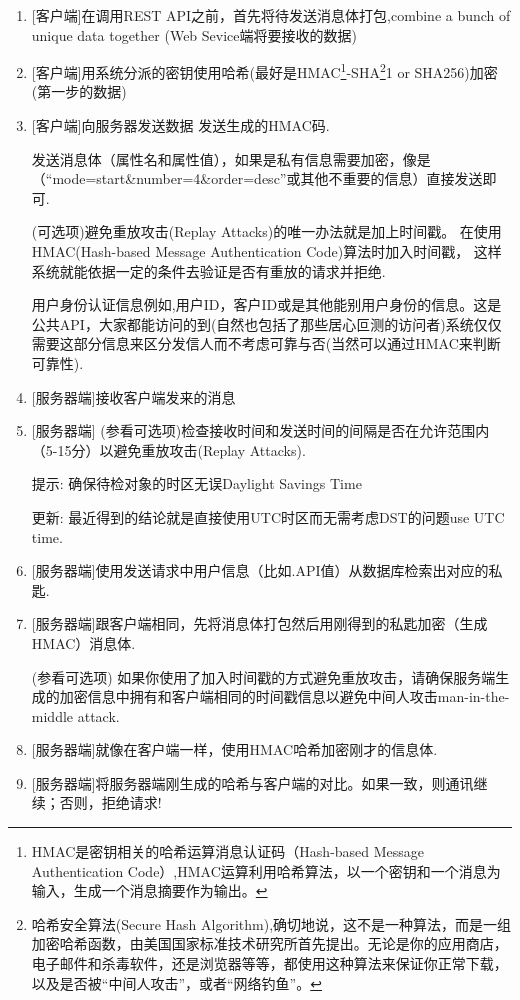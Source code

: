 \documentclass{book}
\begin{document}
\begin{enumerate}
\setcounter{enumi}{0}
\item{[客户端]在调用REST API之前，首先将待发送消息体打包,combine a bunch of unique data together (Web Sevice端将要接收的数据)}
\item{[客户端]用系统分派的密钥使用哈希(最好是HMAC\footnote{HMAC是密钥相关的哈希运算消息认证码（Hash-based Message Authentication Code）,HMAC运算利用哈希算法，以一个密钥和一个消息为输入，生成一个消息摘要作为输出。}-SHA\footnote{哈希安全算法(Secure Hash Algorithm),确切地说，这不是一种算法，而是一组加密哈希函数，由美国国家标准技术研究所首先提出。无论是你的应用商店，电子邮件和杀毒软件，还是浏览器等等，都使用这种算法来保证你正常下载，以及是否被“中间人攻击”，或者“网络钓鱼”。}1 or SHA256)加密(第一步的数据)}
\item{[客户端]向服务器发送数据}
发送生成的HMAC码.

发送消息体（属性名和属性值），如果是私有信息需要加密，像是（“mode=start\&number=4\&order=desc”或其他不重要的信息）直接发送即可.

(可选项)避免重放攻击(Replay Attacks)的唯一办法就是加上时间戳。
在使用HMAC(Hash-based Message Authentication Code)算法时加入时间戳，
这样系统就能依据一定的条件去验证是否有重放的请求并拒绝.

用户身份认证信息例如,用户ID，客户ID或是其他能别用户身份的信息。这是公共API，大家都能访问的到(自然也包括了那些居心叵测的访问者)系统仅仅需要这部分信息来区分发信人而不考虑可靠与否(当然可以通过HMAC来判断可靠性).

\item{[服务器端]接收客户端发来的消息}

\item{[服务器端] (参看可选项)检查接收时间和发送时间的间隔是否在允许范围内（5-15分）以避免重放攻击(Replay Attacks).}

提示: 确保待检对象的时区无误Daylight Savings Time 

更新: 最近得到的结论就是直接使用UTC时区而无需考虑DST的问题use UTC time.

\item{[服务器端]使用发送请求中用户信息（比如.API值）从数据库检索出对应的私匙.}

\item{[服务器端]跟客户端相同，先将消息体打包然后用刚得到的私匙加密（生成HMAC）消息体.}

(参看可选项) 如果你使用了加入时间戳的方式避免重放攻击，请确保服务端生成的加密信息中拥有和客户端相同的时间戳信息以避免中间人攻击man-in-the-middle attack.

\item{[服务器端]就像在客户端一样，使用HMAC哈希加密刚才的信息体.}

\item{[服务器端]将服务器端刚生成的哈希与客户端的对比。如果一致，则通讯继续；否则，拒绝请求!}

\end{enumerate}
\end{document}
